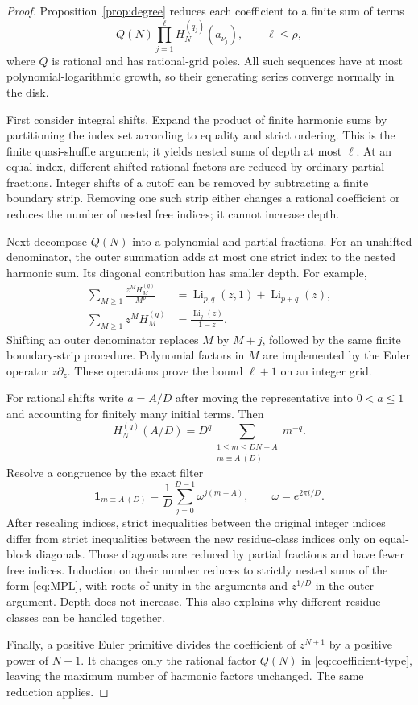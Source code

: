 \documentclass[11pt,letterpaper]{article}
\numberwithin{equation}{section}
\theoremstyle{definition}\newtheorem{definition}[theorem]{Definition}
\theoremstyle{remark}\newtheorem{remark}[theorem]{Remark}
\DeclareMathOperator{\Li}{Li}
\begin{document}
\begin{proof}
Proposition~\ref{prop:degree} reduces each coefficient to a finite sum
of terms
\begin{equation}\label{eq:coefficient-type}
 Q(N)\prod_{j=1}^{\ell}H_N^{(q_j)}(a_{\nu_j}),\qquad \ell\le\rho,
\end{equation}
where $Q$ is rational and has rational-grid poles. All such sequences
have at most polynomial-logarithmic growth, so their generating series
converge normally in the disk.

First consider integral shifts. Expand the product of finite harmonic
sums by partitioning the index set according to equality and strict
ordering. This is the finite quasi-shuffle argument; it yields nested
sums of depth at most $\ell$. At an equal index, different shifted
rational factors are reduced by ordinary partial fractions. Integer
shifts of a cutoff can be removed by subtracting a finite boundary strip.
Removing one such strip either changes a rational coefficient or reduces
the number of nested free indices; it cannot increase depth.

Next decompose $Q(N)$ into a polynomial and partial fractions. For an
unshifted denominator, the outer summation adds at most one strict
index to the nested harmonic sum. Its diagonal contribution has smaller
depth. For example,
\begin{align}
 \sum_{M\ge1}\frac{z^M H_M^{(q)}}{M^p}
    &=\Li_{p,q}(z,1)+\Li_{p+q}(z),\label{eq:basic-nesting}\\
 \sum_{M\ge1}z^M H_M^{(q)}&=\frac{\Li_q(z)}{1-z}.
 \label{eq:basic-harmonic-gf}
\end{align}
Shifting an outer denominator replaces $M$ by $M+j$, followed by the
same finite boundary-strip procedure. Polynomial factors in $M$ are
implemented by the Euler operator $z\partial_z$. These operations
prove the bound $\ell+1$ on an integer grid.

For rational shifts write $a=A/D$ after moving the representative
into $0<a\le1$ and accounting for finitely many initial terms.
Then
\[
 H_N^{(q)}(A/D)=D^q
    \sum_{\substack{1\le m\le DN+A\\m\equiv A\ (D)}}m^{-q}.
\]
Resolve a congruence by the exact filter
\[
 \mathbf1_{m\equiv A\ (D)}
     =\frac1D\sum_{j=0}^{D-1}\omega^{j(m-A)},
 \qquad \omega=e^{2\pi i/D}.
\]
After rescaling indices, strict inequalities between the original
integer indices differ from strict inequalities between the new
residue-class indices only on equal-block diagonals. Those diagonals
are reduced by partial fractions and have fewer free indices. Induction
on their number reduces to strictly nested sums of the form
\eqref{eq:MPL}, with roots of unity in the arguments and $z^{1/D}$
in the outer argument. Depth does not increase. This also explains
why different residue classes can be handled together.

Finally, a positive Euler primitive divides the coefficient of
$z^{N+1}$ by a positive power of $N+1$. It changes only the rational
factor $Q(N)$ in \eqref{eq:coefficient-type}, leaving the maximum
number of harmonic factors unchanged. The same reduction applies.
\end{proof}
\end{document}
